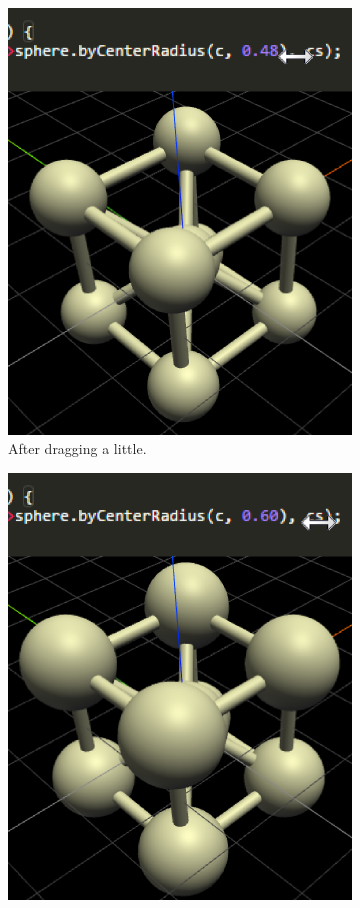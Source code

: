 \begin{figure}
\begin{subfigure}[b]{0.32\linewidth}
    \includegraphics[width=1.0\linewidth]{./images/literal_adjustment/middle_crop}
    \caption{After dragging a little.}
  \end{subfigure}
  \begin{subfigure}[b]{0.32\linewidth}
    \includegraphics[width=1.0\linewidth]{./images/literal_adjustment/end_crop}

\end{subfigure}
\end{figure}
